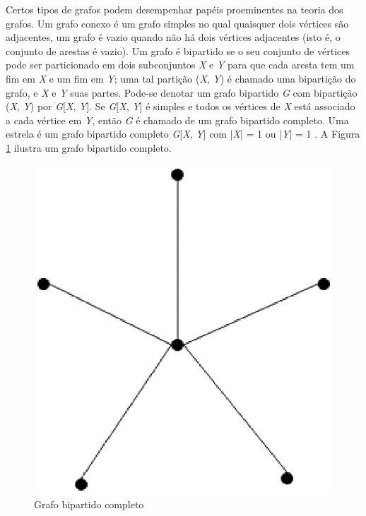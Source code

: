Certos tipos de grafos podem desempenhar papéis proeminentes na teoria dos grafos. Um grafo conexo é um grafo simples no qual quaisquer dois vértices são adjacentes, um grafo é vazio quando não há dois vértices adjacentes (isto é, o conjunto de arestas é vazio). Um grafo é bipartido se o seu conjunto de vértices pode ser particionado em dois subconjuntos \textit{X} e \textit{Y} para que cada aresta tem um fim em \textit{X} e um fim em \textit{Y}; uma tal partição (\textit{X}, \textit{Y}) é chamado uma bipartição do grafo, e \textit{X} e \textit{Y} suas partes. Pode-se denotar um grafo bipartido \textit{G} com bipartição (\textit{X}, \textit{Y}) por \textit{G}[\textit{X}, \textit{Y}]. Se \textit{G}[\textit{X}, \textit{Y}] é simples e todos os vértices de \textit{X} está associado a cada vértice em \textit{Y}, então \textit{G} é chamado de um grafo bipartido completo. Uma estrela é um grafo bipartido completo \textit{G}[\textit{X}, \textit{Y}] com |\textit{X}| = 1 ou |\textit{Y}| = 1 \cite{Diestel:1997}.  A Figura \ref{bipartido_completo} ilustra um grafo bipartido completo.

\begin{figure}[!h]
	\centering
	\includegraphics[scale=0.5]{figuras/capitulo1/bipartido_completo.eps}
	\caption{Grafo bipartido completo}
	\label{bipartido_completo}
\end{figure}

